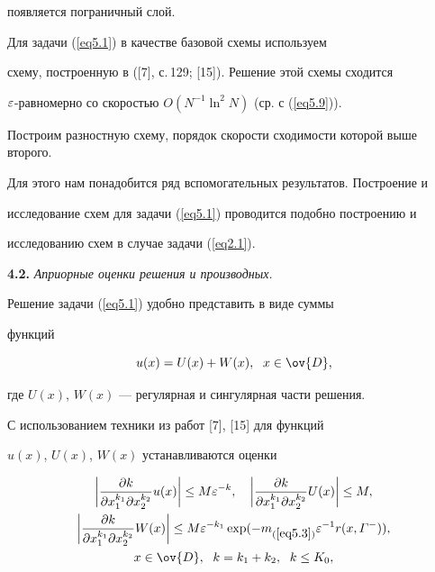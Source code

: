 появляется пограничный слой.





Для задачи (\ref{eq5.1}) в качестве базовой схемы используем


схему, построенную в ([7], с.\,129; [15]). Решение этой схемы сходится


$\varepsilon$-равномерно со скоростью $O(N^{-1}\ln^2 N)$ (ср. с (\ref{eq5.9})).





Построим разностную схему, порядок скорости сходимости которой выше второго.


Для этого нам понадобится ряд вспомогательных результатов. Построение и


исследование схем для задачи (\ref{eq5.1}) проводится подобно построению и


исследованию схем в случае задачи (\ref{eq2.1}).


\medskip





{\bf 4.2.} {\it Априорные оценки решения и производных.}


Решение задачи (\ref{eq5.1}) удобно представить в виде суммы


функций


\begin{equation}


\label{eq5.2}


u(x)=U(x)+W(x),\ \; x\in\ov{D},


\end{equation}


где $U(x)$, $W(x)$ --- регулярная и сингулярная части решения.


С использованием техники из работ [7], [15] для функций


$u(x)$, $U(x)$, $W(x)$ устанавливаются оценки


\begin{gather}


\label{eq5.3}


\bigg|\dy u(x)\bigg|\le M\eps^{-k}, \quad


\bigg|\dy U(x)\bigg|\le M,\\


\bigg|\dy W(x)\bigg|\le M\eps^{-k_1}\exp(-m_{(\ref{eq5.3})}


\eps^{-1} r(x,\varGamma^{-})),\notag\\


x\in\ov{D},\ \; k=k_1+k_2,\ \; k\le K_0,\notag


\end{gather}


